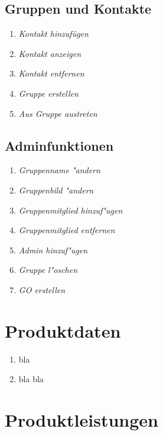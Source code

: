 \documentclass[parskip=full]{scrartcl}
\def\threedigits#1{%
  \ifnum#1<100 0\fi
  \ifnum#1<10 0\fi
  \number#1}
\begin{document}
\subsection{Gruppen und Kontakte}

\begin{enumerate}[label={\textbf{/F\protect\threedigits{\theenumi}0/}}, leftmargin=*]
	\item \textit{Kontakt hinzufügen}
	\item \textit{Kontakt anzeigen}
	\item \textit{Kontakt entfernen}
	\item \textit{Gruppe erstellen}
	\item \textit{Aus Gruppe austreten}
\end{enumerate}

\subsection{Adminfunktionen}

\begin{enumerate}[label={\textbf{/F\protect\threedigits{\theenumi}0/}}, leftmargin=*, resume]
	\item \textit{Gruppenname "andern}
	\item \textit{Gruppenbild "andern}
	\item \textit{Gruppenmitglied hinzuf"ugen}
	\item \textit{Gruppenmitglied entfernen}	
	\item \textit{Admin hinzuf"ugen}
	\item \textit{Gruppe l"oschen}
	\item \textit{GO erstellen}
\end{enumerate}

\section{Produktdaten}

\begin{enumerate}[label={\textbf{/D\protect\threedigits{\theenumi}0/}}, leftmargin=*]
	\item bla
	\item bla bla
\end{enumerate}

\section{Produktleistungen}
\end{document}
